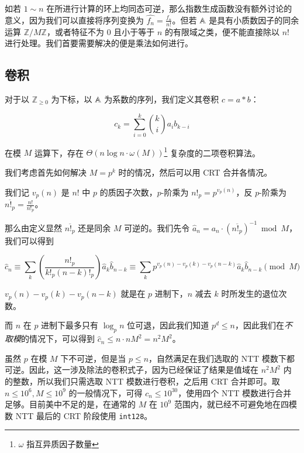 如若 $1\sim n$ 在所进行计算的环上均同态可逆，那么指数生成函数没有额外讨论的意义，因为我们可以直接将序列变换为 $\widehat {f_n} = \frac {f_n}{n!}$。但若 $\mathbb A$ 是具有小质数因子的同余运算 $\mathbb Z/M\mathbb Z$，或者特征不为 $0$ 且小于等于 $n$ 的有限域之类，便不能直接除以 $n!$ 进行处理。我们首要需要解决的便是乘法如何进行。

\subsection{卷积}

\begin{definition}[二项卷积]
对于以 $\mathbb Z_{\ge 0}$ 为下标，以 $\mathbb A$ 为系数的序列，我们定义其卷积 $c = a * b$：

$$
c_k = \sum_{i = 0}^k \binom k i a_i b_{k-i}
$$
\end{definition}

\begin{theorem}
在模 $M$ 运算下，存在 $\Theta(n\log n \cdot \omega(M))$\footnote{$\omega$ 指互异质因子数量} 复杂度的二项卷积算法。
\end{theorem}

我们考虑首先如何解决 $M = p^k$ 时的情况，然后可以用 CRT 合并各情况。

我们记 $v_p(n)$ 是 $n!$ 中 $p$ 的质因子次数，$p$-阶乘为 $n!_p = p^{v_p(n)}$，反 $p$-阶乘为 $\overline{n!_p} = \frac{n!}{n!_p}$。

那么由定义显然 $\overline{n!_p}$ 还是同余 $M$ 可逆的。我们先令 $\widehat a_n = a_n \cdot \left( \overline{n!_p} \right)^{-1} \bmod M$，我们可以得到

$$
\widehat c_n \equiv \sum_k \left(\frac{n!_p}{k!_p (n-k)!_p}\right) \widehat a_k \widehat b_{n-k} \equiv \sum_k p^{v_p(n)-v_p(k)-v_p(n-k)} \widehat a_k \widehat b_{n-k} \pmod M
$$

\begin{theorem}[Kummer]

$v_p(n)-v_p(k)-v_p(n-k)$ 就是在 $p$ 进制下，$n$ 减去 $k$ 时所发生的退位次数。

\end{theorem}

而 $n$ 在 $p$ 进制下最多只有 $\log_p n$ 位可退，因此我们知道 $p^d \le n$，因此我们在\emph{不取模}的情况下，可以得到 $\widehat c_n \le n \cdot nM^2 = n^2M^2$。

虽然 $p$ 在模 $M$ 下不可逆，但是当 $p\le n$，自然满足在我们选取的 NTT 模数下都可逆。因此，这一涉及除法的卷积式子，因为已经保证了结果是值域在 $n^2M^2$ 内的整数，所以我们只需选取 NTT 模数进行卷积，之后用 CRT 合并即可。取 $n\le 10^6, M\le 10^9$ 的一般情况下，可得 $c_n \le 10^{30}$，使用四个 NTT 模数进行合并足够。目前美中不足的是，在通常的 $M$ 在 $10^9$ 范围内，就已经不可避免地在四模数 NTT 最后的 CRT 阶段使用 \texttt{int128}。

